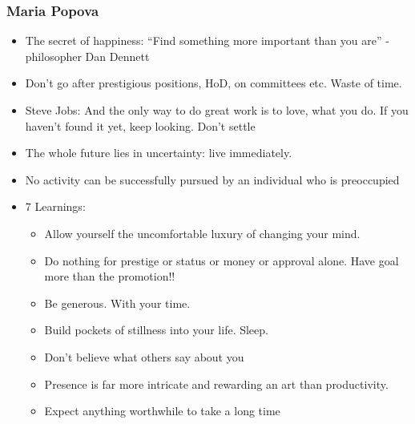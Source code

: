 \begin{frame}[fragile]\frametitle{Maria Popova}

	\begin{itemize}
	\item  The secret of happiness: ``Find something more important than you are'' - philosopher Dan Dennett
	\item Don't go after prestigious positions, HoD, on committees etc. Waste of time.
	\item Steve Jobs:  And the only way to do great work is to love, what you do. If you haven't found it yet, keep looking. Don't settle
	\item The whole future lies in uncertainty: live immediately.
	\item No activity can be successfully pursued by an individual who is preoccupied 
	\item 7 Learnings:
		\begin{itemize}
		\item Allow yourself the uncomfortable luxury of changing your mind.
		\item Do nothing for prestige or status or money or approval alone. Have goal more than the promotion!!
		\item Be generous. With your time.
		\item Build pockets of stillness into your life. Sleep.
		\item Don't believe what others say about you
		\item Presence is far more intricate and rewarding an art than productivity.
		\item Expect anything worthwhile to take a long time
		\end{itemize}
	\end{itemize}

\end{frame}

